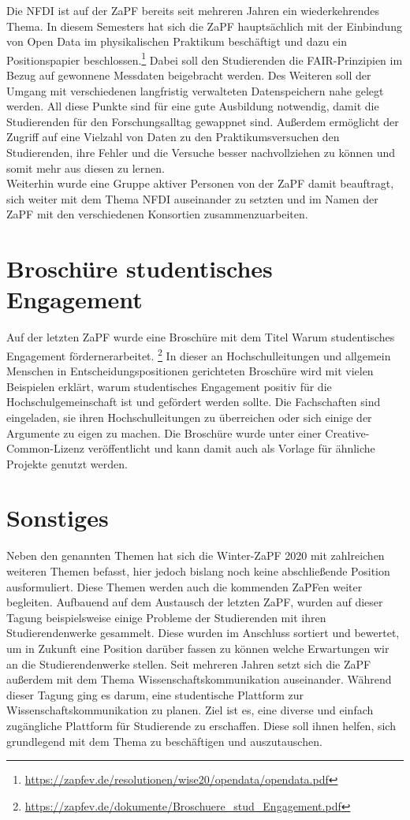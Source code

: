 \documentclass{scrartcl}
\begin{document}
Die NFDI ist auf der ZaPF bereits seit mehreren Jahren ein wiederkehrendes Thema. In diesem Semesters hat sich die ZaPF hauptsächlich mit der Einbindung von Open Data im physikalischen Praktikum beschäftigt und dazu ein Positionspapier beschlossen.\footnote{\url{https://zapfev.de/resolutionen/wise20/opendata/opendata.pdf}} Dabei soll den Studierenden die FAIR-Prinzipien im Bezug auf gewonnene Messdaten beigebracht werden. Des Weiteren soll der Umgang mit verschiedenen langfristig verwalteten Datenspeichern nahe gelegt werden. All diese Punkte sind für eine gute Ausbildung notwendig, damit die Studierenden für den Forschungsalltag gewappnet sind. Außerdem ermöglicht der Zugriff auf eine Vielzahl von Daten zu den Praktikumsversuchen den Studierenden, ihre Fehler und die Versuche besser nachvollziehen zu können und somit mehr aus diesen zu lernen.\\
Weiterhin wurde eine Gruppe aktiver Personen von der ZaPF damit beauftragt, sich weiter mit dem Thema NFDI auseinander zu setzten und im Namen der ZaPF mit den verschiedenen Konsortien zusammenzuarbeiten. 

\section*{Broschüre studentisches Engagement}

Auf der letzten ZaPF wurde eine Broschüre mit dem Titel \glqq Warum studentisches Engagement fördern\grqq\space erarbeitet. \footnote{\url{https://zapfev.de/dokumente/Broschuere_stud_Engagement.pdf}} In dieser an Hochschulleitungen und allgemein Menschen in Entscheidungspositionen gerichteten Broschüre wird mit vielen Beispielen erklärt, warum studentisches Engagement positiv für die Hochschulgemeinschaft ist und gefördert werden sollte. Die Fachschaften sind eingeladen, sie ihren Hochschulleitungen zu überreichen oder sich einige der Argumente zu eigen zu machen. Die Broschüre wurde unter einer Creative-Common-Lizenz veröffentlicht und kann damit auch als Vorlage für ähnliche Projekte genutzt werden.

\section*{Sonstiges}

Neben den genannten Themen hat sich die Winter-ZaPF 2020 mit zahlreichen weiteren Themen befasst, hier jedoch bislang noch keine abschließende Position ausformuliert. Diese Themen werden auch die kommenden ZaPFen weiter begleiten. Aufbauend auf dem Austausch der letzten ZaPF, wurden auf dieser Tagung beispielsweise einige Probleme der Studierenden mit ihren Studierendenwerke gesammelt. Diese wurden im Anschluss sortiert und bewertet, um in Zukunft eine Position darüber fassen zu können welche Erwartungen wir an die Studierendenwerke stellen. Seit mehreren Jahren setzt sich die ZaPF außerdem mit dem Thema Wissenschaftskommunikation auseinander. Während dieser Tagung ging es darum, eine studentische Plattform zur Wissenschaftskommunikation zu planen. Ziel ist es, eine diverse und einfach zugängliche Plattform für Studierende zu erschaffen. Diese soll ihnen helfen, sich grundlegend mit dem Thema zu beschäftigen und auszutauschen.
\end{document}
